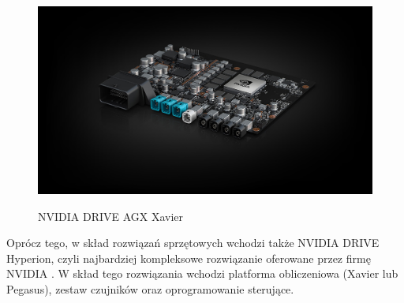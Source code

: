 \begin{enumerate*}
\begin{figure}[h]
\begin{center}
\includegraphics[width=15cm]{resources/figures/nv-drive-xavier.jpg}
\caption{NVIDIA DRIVE AGX Xavier}
\label{NvidiaDriveXavier}
\end{center}
\end{figure}
\end{enumerate*}

\vspace{-1cm}
Oprócz tego, w skład rozwiązań sprzętowych wchodzi także NVIDIA DRIVE Hyperion, czyli najbardziej kompleksowe rozwiązanie oferowane przez firmę NVIDIA \cite{nvidiaDrive:hyperion}. W skład tego rozwiązania wchodzi platforma obliczeniowa (Xavier lub Pegasus), zestaw czujników oraz oprogramowanie sterujące.

